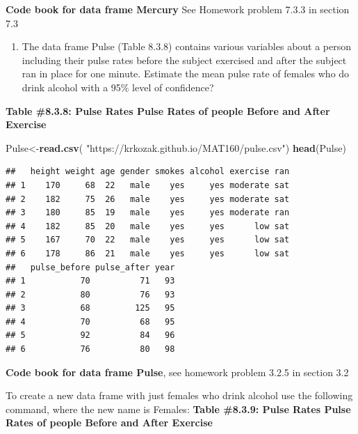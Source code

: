\documentclass[
]{book}
\newenvironment{Shaded}{\begin{snugshade}}{\end{snugshade}}
\newcommand{\KeywordTok}[1]{\textcolor[rgb]{0.13,0.29,0.53}{\textbf{#1}}}
\newcommand{\NormalTok}[1]{#1}
\newcommand{\OperatorTok}[1]{\textcolor[rgb]{0.81,0.36,0.00}{\textbf{#1}}}
\newcommand{\StringTok}[1]{\textcolor[rgb]{0.31,0.60,0.02}{#1}}
\providecommand{\tightlist}{%
  \setlength{\itemsep}{0pt}\setlength{\parskip}{0pt}}
\begin{document}
\textbf{Code book for data frame Mercury} See Homework problem 7.3.3 in section 7.3

\begin{enumerate}
\def\labelenumi{\arabic{enumi}.}
\setcounter{enumi}{3}
\tightlist
\item
  The data frame Pulse (Table 8.3.8) contains various variables about a person including their pulse rates before the subject exercised and after the subject ran in place for one minute. Estimate the mean pulse rate of females who do drink alcohol with a 95\% level of confidence?
\end{enumerate}

\textbf{Table \#8.3.8: Pulse Rates Pulse Rates of people Before and After Exercise}

\begin{Shaded}
\begin{Highlighting}[]
\NormalTok{Pulse<-}\KeywordTok{read.csv}\NormalTok{(}
  \StringTok{"https://krkozak.github.io/MAT160/pulse.csv"}\NormalTok{)}
\KeywordTok{head}\NormalTok{(Pulse)}
\end{Highlighting}
\end{Shaded}

\begin{verbatim}
##   height weight age gender smokes alcohol exercise ran
## 1    170     68  22   male    yes     yes moderate sat
## 2    182     75  26   male    yes     yes moderate sat
## 3    180     85  19   male    yes     yes moderate ran
## 4    182     85  20   male    yes     yes      low sat
## 5    167     70  22   male    yes     yes      low sat
## 6    178     86  21   male    yes     yes      low sat
##   pulse_before pulse_after year
## 1           70          71   93
## 2           80          76   93
## 3           68         125   95
## 4           70          68   95
## 5           92          84   96
## 6           76          80   98
\end{verbatim}

\textbf{Code book for data frame Pulse}, see homework problem 3.2.5 in section 3.2

To create a new data frame with just females who drink alcohol use the following command, where the new name is Females:
\textbf{Table \#8.3.9: Pulse Rates Pulse Rates of people Before and After Exercise}

\begin{Shaded}
\end{Shaded}
\end{document}
